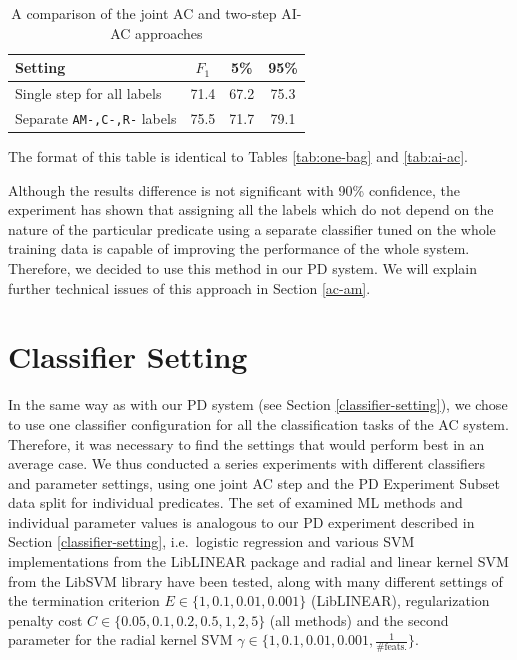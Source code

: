 \documentclass[12pt,notitlepage]{report}
\begin{document}
\begin{table}[htb]\label{tab:separate-ams}
\caption{A comparison of the joint AC and two-step AI-AC approaches}\footnotesize
\begin{center}
\begin{tabular}{|l|c|c|c|}\hline
\bf Setting & $F_1$ & \bf 5\% & \bf 95\% \\\hline
Single step for all labels & 71.4 & 67.2 & 75.3 \\
Separate \texttt{AM-,C-,R-} labels & 75.5 & 71.7 & 79.1 \\\hline
\end{tabular}
\end{center}
The format of this table is identical to Tables \ref{tab:one-bag} and \ref{tab:ai-ac}.
\end{table}

Although the results difference is not significant with 90\% confidence, the experiment has shown that assigning all the labels which do not depend on the nature of the particular predicate using a separate classifier tuned on the whole training data is capable of improving the performance of the whole system. Therefore, we decided to use this method in our PD system. We will explain further technical issues of this approach in Section \ref{ac-am}. 

\section{Classifier Setting}\label{ac-setting}

In the same way as with our PD system (see Section \ref{classifier-setting}), we chose to use one classifier configuration for all the classification tasks of the AC system. Therefore, it was necessary to find the settings that would perform best in an average case. We thus conducted a series experiments with different classifiers and parameter settings, using one joint AC step and the PD Experiment Subset data split for individual predicates. The set of examined ML methods and individual parameter values is analogous to our PD experiment described in Section \ref{classifier-setting}, i.e.\ logistic regression and various SVM implementations from the LibLINEAR package and radial and linear kernel SVM from the LibSVM library have been tested, along with many different settings of the termination criterion $E\in\{1,0.1,0.01,0.001\}$ (LibLINEAR), regularization penalty cost $C\in\{0.05,0.1,0.2,0.5,1,2,5\}$ (all methods) and the second parameter for the radial kernel SVM $\gamma\in\{1,0.1,0.01,0.001,\frac{1}{\mbox{\# feats.}}\}$. 
\end{document}
